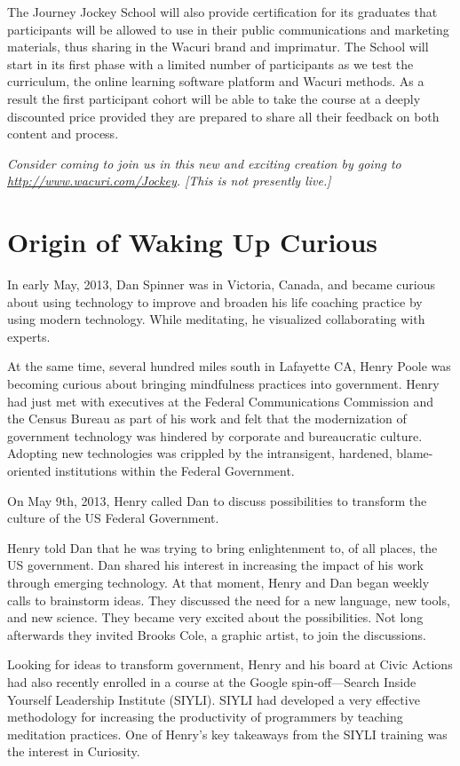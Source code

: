 \documentclass[12pt]{book}
\begin{document}
The Journey Jockey School will also provide certification for its
graduates that participants will be allowed to use in their public
communications and marketing materials, thus sharing in the Wacuri
brand and imprimatur. The School will start in its first phase with a
limited number of participants as we test the curriculum, the online
learning software platform and Wacuri methods. As a result the first
participant cohort will be able to take the course at a deeply
discounted price provided they are prepared to share all their
feedback on both content and process.

{\em Consider coming to join us in this new and exciting creation by going
to \url{http://www.wacuri.com/Jockey}. [This is not presently live.]}


\chapter{Origin of Waking Up Curious}

In early May, 2013, Dan Spinner was in Victoria, Canada, and became
curious about using technology to improve and broaden his life
coaching practice by using modern technology. While meditating, he
visualized collaborating with experts.
					
At the same time, several hundred miles south in Lafayette CA, Henry
Poole was becoming curious about bringing mindfulness practices into
government.  Henry had just met with executives at the Federal
Communications Commission and the Census Bureau as part of his work and
felt that the modernization of government technology was hindered by
corporate and bureaucratic culture.  Adopting new technologies was
crippled by the intransigent, hardened, blame-oriented institutions
within the Federal Government.
					
On May 9th, 2013, Henry called Dan to discuss possibilities to
transform the culture of the US Federal Government.
					
Henry told Dan that he was trying to bring enlightenment to, of all
places, the US government. Dan shared his interest in increasing the
impact of his work through emerging technology. At that moment, Henry
and Dan began weekly calls to brainstorm ideas. They discussed the
need for a new language, new tools, and new science. They became very
excited about the possibilities. Not long afterwards they invited
Brooks Cole, a graphic artist, to join the discussions.
					
Looking for ideas to transform government, Henry and his board at
Civic Actions had also recently enrolled in a course at the Google
spin-off---Search Inside Yourself Leadership Institute (SIYLI). SIYLI
had developed a very effective methodology for increasing the
productivity of programmers by teaching meditation practices. One of
Henry’s key takeaways from the SIYLI training was the interest in
Curiosity.
					
\end{document}
